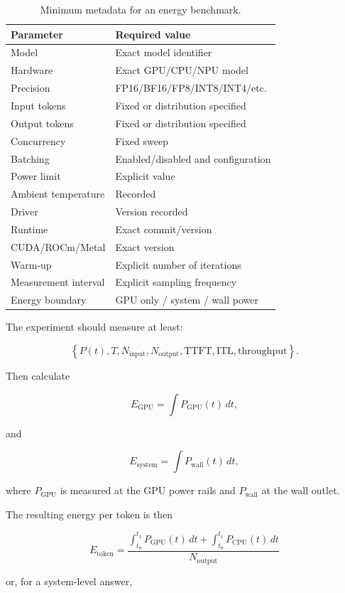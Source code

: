 \documentclass[11pt,a4paper]{article}
\begin{document}
\begin{table}[H]
\centering
\begin{tabular}{ll}
\toprule
Parameter & Required value \\
\midrule
Model & Exact model identifier \\
Hardware & Exact GPU/CPU/NPU model \\
Precision & FP16/BF16/FP8/INT8/INT4/etc. \\
Input tokens & Fixed or distribution specified \\
Output tokens & Fixed or distribution specified \\
Concurrency & Fixed sweep \\
Batching & Enabled/disabled and configuration \\
Power limit & Explicit value \\
Ambient temperature & Recorded \\
Driver & Version recorded \\
Runtime & Exact commit/version \\
CUDA/ROCm/Metal & Exact version \\
Warm-up & Explicit number of iterations \\
Measurement interval & Explicit sampling frequency \\
Energy boundary & GPU only / system / wall power \\
\bottomrule
\end{tabular}
\caption{Minimum metadata for an energy benchmark.}
\end{table}

The experiment should measure at least:

\[
\left\{
P(t),
T,
N_{\mathrm{input}},
N_{\mathrm{output}},
\mathrm{TTFT},
\mathrm{ITL},
\mathrm{throughput}
\right\}.
\]

Then calculate

\[
E_{\mathrm{GPU}}
=
\int P_{\mathrm{GPU}}(t)\,dt,
\]

and

\[
E_{\mathrm{system}}
=
\int P_{\mathrm{wall}}(t)\,dt,
\]

where $P_{\mathrm{GPU}}$ is measured at the GPU power rails and
$P_{\mathrm{wall}}$ at the wall outlet.

The resulting energy per token is then

\[
\boxed{
E_{\mathrm{token}}
=
\frac{
\int_{t_0}^{t_1}P_{\mathrm{GPU}}(t)\,dt
+
\int_{t_0}^{t_1}P_{\mathrm{CPU}}(t)\,dt
}{
N_{\mathrm{output}}
}
}
\]

or, for a system-level answer,
\end{document}
